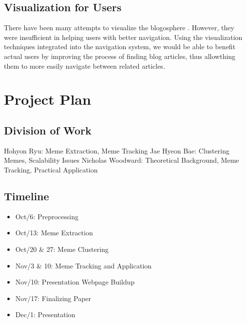 \documentclass{sig-alternate}
\begin{document}
\subsection{Visualization for Users}

There have been many attempts to visualize the blogosphere \cite{Tauro2008, Uchida2007}. However, they were insufficient in helping users with better navigation. Using the visualization techniques integrated into the navigation system, we would be able to benefit actual users by improving the process of finding blog articles, thus allowthing them to more easily navigate between related articles.

\section{Project Plan}

\subsection{Division of Work}

Hohyon Ryu: Meme Extraction, Meme Tracking
Jae Hyeon Bae: Clustering Memes, Scalability Issues
Nicholas Woodward: Theoretical Background, Meme Tracking, Practical Application

\subsection{Timeline}


\begin{itemize}
  \item Oct/6: Preprocessing
  \item Oct/13: Meme Extraction
  \item Oct/20 \& 27: Meme Clustering
  \item Nov/3 \& 10: Meme Tracking and Application
  \item Nov/10: Presentation Webpage Buildup
  \item Nov/17: Finalizing Paper
  \item Dec/1: Presentation
\end{itemize}


%

\end{document}
